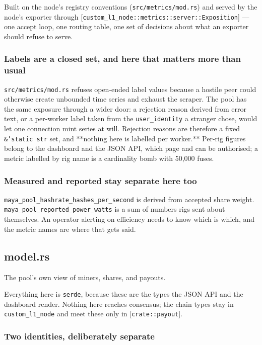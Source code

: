 \documentclass[11pt,a4paper]{article}
\begin{document}
Built on the node's registry conventions (\texttt{src/metrics/mod.rs}) and served
by the node's exporter through
[\texttt{custom\_l1\_node::metrics::server::Exposition}] — one accept loop, one
routing table, one set of decisions about what an exporter should refuse to
serve.

\subsubsection{Labels are a closed set, and here that matters more than usual}

\texttt{src/metrics/mod.rs} refuses open-ended label values because a hostile peer
could otherwise create unbounded time series and exhaust the scraper. The
pool has the same exposure through a wider door: a rejection reason derived
from error text, or a per-worker label taken from the \texttt{user\_identity} a
stranger chose, would let one connection mint series at will. Rejection
reasons are therefore a fixed \texttt{\&'static str} set, and **nothing here is
labelled per worker.** Per-rig figures belong to the dashboard and the JSON
API, which page and can be authorised; a metric labelled by rig name is a
cardinality bomb with 50,000 fuses.

\subsubsection{Measured and reported stay separate here too}

\texttt{maya\_pool\_hashrate\_hashes\_per\_second} is derived from accepted share weight.
\texttt{maya\_pool\_reported\_power\_watts} is a sum of numbers rigs sent about
themselves. An operator alerting on efficiency needs to know which is which,
and the metric names are where that gets said.

\subsection{model.rs}
The pool's own view of miners, shares, and payouts.

Everything here is \texttt{serde}, because these are the types the JSON API and the
dashboard render. Nothing here reaches consensus; the chain types stay in
\texttt{custom\_l1\_node} and meet these only in [\texttt{crate::payout}].

\subsubsection{Two identities, deliberately separate}
\end{document}
